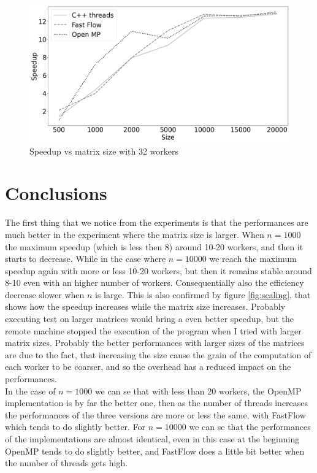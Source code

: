 \documentclass[12pt]{article}
\begin{document}
	\begin{figure}[H]
		\centering
		\includegraphics[width=13cm]{./images/speedup_vs_size}
		\caption{Speedup vs matrix size with 32 workers}
	\end{figure}


	\section{Conclusions}
	The first thing that we notice from the experiments is that the performances are much better in the experiment where the matrix size is larger. When $n = 1000$ the maximum speedup (which is less then 8) around 10-20 workers, and then it starts to decrease. While in the case where $n = 10000$ we reach the maximum speedup again with more or less 10-20 workers, but then it remains stable around 8-10 even with an higher number of workers. Consequentially also the efficiency decrease slower when $n$ is large. This is also confirmed by figure \ref{fig:scaling}, that shows how the speedup increases while the matrix size increases. Probably executing test on larger matrices would bring a even better speedup, but the remote machine stopped the execution of the program when I tried with larger matrix sizes. Probably the better performances with larger sizes of the matrices are due to the fact, that increasing the size cause the grain of the computation of each worker to be coarser, and so the overhead has a reduced impact on the performances.\\
	In the case of $n = 1000$ we can se that with less than 20 workers, the OpenMP implementation is by far the better one, then as the number of threads increases the performances of the three versions are more or less the same, with FastFlow which tends to do slightly better. For $n = 10000$ we can se that the performances of the implementations are almost identical, even in this case at the beginning OpenMP tends to do slightly better, and FastFlow does a little bit better when the number of threads gets high.\\
	
	
\end{document}
